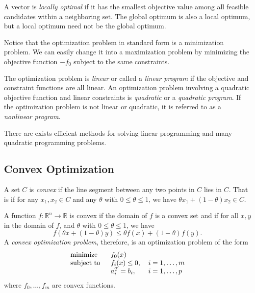 A vector is \textit{locally optimal} if it has the smallest objective value among all feasible candidates within a neighboring set. The global optimum is also a local optimum, but a local optimum need not be the global optimum.

Notice that the optimization problem in standard form is a minimization problem.  We can easily change it into a maximization problem by minimizing the objective function $-f_0$ subject to the same constraints.

The optimization problem is \textit{linear} or called a \textit{linear program} if the objective and constraint functions are all linear. An optimization problem involving a quadratic objective function and linear constraints is \textit{quadratic} or a \textit{quadratic program}. If the optimization problem is not linear or quadratic, it is referred to as a \textit{nonlinear program}.

There are exists efficient methods for solving linear programming and many quadratic programming problems.

\subsection{Convex Optimization}

A set $C$ is \textit{convex} if the line segment between any two points in $C$ lies in $C$. That is if for any $x_1,x_2\in C$ and any $\theta$ with $0\leq\theta\leq 1$, we have $\theta x_1+(1-\theta)x_2\in C$.

A function $f : \mathbb{R}^n\rightarrow\mathbb{R}$ is convex if the domain of $f$ is a convex set and if for all $x,y$ in the domain of $f$, and $\theta$ with $0\leq\theta\leq 1$, we have
\begin{equation}
	f\left(\theta x+\left(1-\theta\right)y\right)\leq\theta f(x)+(1-\theta)f(y).
	\label{eqn:Convexity}
\end{equation}
A \textit{convex optimization problem}, therefore, is an optimization problem of the form
\begin{equation}
	\begin{tabular}{lll}
		\text{minimize }   & $f_0(x)$        &                 \\
		\text{subject to } & $f_i(x)\leq 0$, & $i=1,\ldots, m$ \\
		& $a_i^T = b_i$,  & $i=1,\ldots, p$ 
	\end{tabular}\label{ConvexOptimization}
\end{equation}
where $f_0,\ldots,f_m$ are convex functions.

